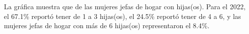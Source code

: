 La gráfica muestra que de las mujeres jefas de hogar con hijas(os). Para el 2022, el 67.1\% reportó tener de 1 a 3 hijas(os), el 24.5\% reportó tener de 4 a 6, y las mujeres jefas de hogar con más de 6 hijas(os) representaron el 8.4\%. 